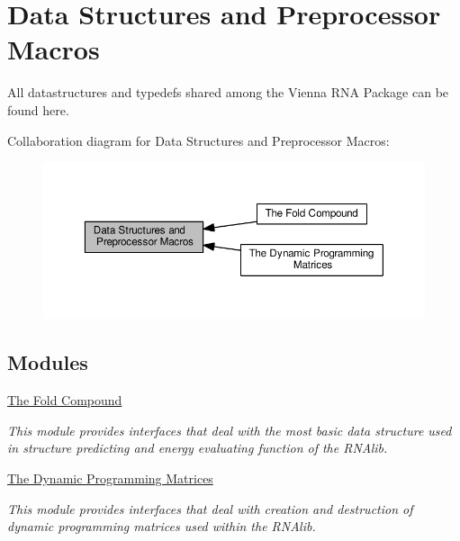\hypertarget{group__data__structures}{}\section{Data Structures and Preprocessor Macros}
\label{group__data__structures}


All datastructures and typedefs shared among the Vienna R\+NA Package can be found here.  


Collaboration diagram for Data Structures and Preprocessor Macros\+:
\nopagebreak
\begin{figure}[H]
\begin{center}
\leavevmode
\includegraphics[width=350pt]{group__data__structures}
\end{center}
\end{figure}
\subsection*{Modules}
\begin{DoxyCompactItemize}
\item 
\hyperlink{group__fold__compound}{The Fold Compound}
\begin{DoxyCompactList}\small\item\em This module provides interfaces that deal with the most basic data structure used in structure predicting and energy evaluating function of the R\+N\+Alib. \end{DoxyCompactList}\item 
\hyperlink{group__dp__matrices}{The Dynamic Programming Matrices}
\begin{DoxyCompactList}\small\item\em This module provides interfaces that deal with creation and destruction of dynamic programming matrices used within the R\+N\+Alib. \end{DoxyCompactList}\end{DoxyCompactItemize}
